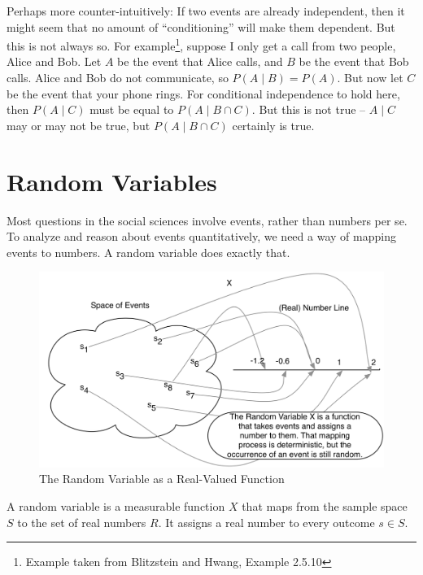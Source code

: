 \documentclass[
]{book}
\begin{document}
Perhaps more counter-intuitively: If two events are already independent, then it might seem that no amount of ``conditioning'' will make them dependent. But this is not always so. For example\footnote{Example taken from Blitzstein and Hwang, Example 2.5.10}, suppose I only get a call from two people, Alice and Bob. Let \(A\) be the event that Alice calls, and \(B\) be the event that Bob calls. Alice and Bob do not communicate, so \(P(A \mid B) = P(A).\) But now let \(C\) be the event that your phone rings. For conditional independence to hold here, then \(P(A \mid C)\) must be equal to \(P(A \mid B \cap C).\) But this is not true -- \(A \mid C\) may or may not be true, but \(P(A \mid B \cap C)\) certainly is true.

\hypertarget{random-variables}{%
\section{Random Variables}\label{random-variables}}

Most questions in the social sciences involve events, rather than numbers per se. To analyze and reason about events quantitatively, we need a way of mapping events to numbers. A random variable does exactly that.

\begin{figure}
\centering
\includegraphics{figure-latex/rv.png}
\caption{\label{fig:rv-image}The Random Variable as a Real-Valued Function}
\end{figure}

\begin{definition}
\protect\hypertarget{def:unnamed-chunk-71}{}\label{def:unnamed-chunk-71}A random variable is a measurable function \(X\) that maps from the sample space \(S\) to the set of real numbers \(R.\) It assigns a real number to every outcome \(s \in S\).
\end{definition}
\end{document}
